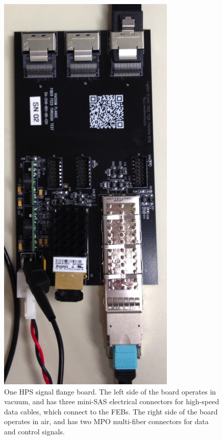 \begin{figure}[htp]
    \includegraphics[angle=90,width=\textwidth]{detector/figs/flangeboard}
    \caption{One HPS signal flange board.
    The left side of the board operates in vacuum, and has three mini-SAS electrical connectors for high-speed data cables, which connect to the FEBs.
The right side of the board operates in air, and has two MPO multi-fiber connectors for data and control signals.}
    \label{fig:flangeboard}
\end{figure}

